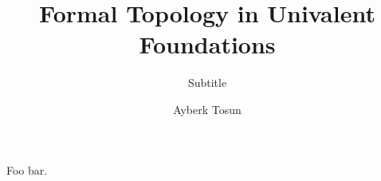 

\title{Formal Topology in Univalent Foundations}
\subtitle{Subtitle}
\author{Ayberk Tosun}
\newcommand{\authorname}{Ayberk Tosun}





\newcommand{\reals}{\mathbb{R}}
\newcommand{\ball}[2]{\mathfrak{A}(#1, #2)}
\newcommand{\neighbourhood}[1]{\mathbf{N}(#1)}

\newcommand{\pity}[3]{\prod_{(#1~:~#2)} #3}
\newcommand{\sigmaty}[3]{\sum_{(#1~:~#2)} #3}
\newcommand{\univ}{\mathcal{U}}
\newcommand{\isaprop}[1]{\mathsf{IsProp}\left(#1\right)}
\newcommand{\abs}[1]{\left| #1 \right|}
\newcommand{\pow}[1]{\mathcal{P}\left(#1\right)}
\newcommand{\sub}[1]{\mathbf{Fam}\left(#1\right)}

\newcommand{\dcsubsetnm}{\mathsf{DCSubset}}
\newcommand{\dcsubset}[1]{\dcsubsetnm{}\left(#1\right)}

\newcommand{\posetstrnm}{\mathsf{PosetStr}}
\newcommand{\posetstr}[1]{\posetstrnm{}\left(#1\right)}

\newcommand{\framestrnm}{\mathsf{FrameStr}}
\newcommand{\framestr}[1]{\framestrnm{}\left(#1\right)}
\newcommand{\frameax}[1]{\mathsf{FrameAx}\left(#1\right)}

\newcommand{\is}{:\equiv}

\newcommand{\paragraphsummary}[1]{\paragraph*{#1}}

\setmainfont{XITS}



\maketitlepage{}

\begin{abstract}
  \lipsum[1-2]{}
\end{abstract}

\begin{acknowledgements}
  Foo bar.
\end{acknowledgements}

\makelists{}









\makebackmatter{}


